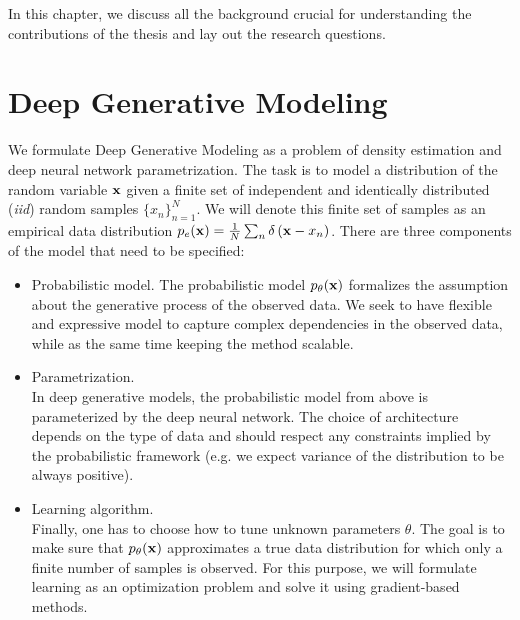 In this chapter, we discuss all the background crucial for understanding the contributions of the thesis and lay out the research questions. 


\section{Deep Generative Modeling}
We formulate Deep Generative Modeling as a problem of density estimation and deep neural network parametrization. 
The task is to model a distribution of the random variable ${\mathbf{x}}$ given a finite set of independent and identically distributed (\textit{iid}) random samples $\{x_n\}_{n=1}^N$. 
We will denote this finite set of samples as an empirical data distribution $p_e({\mathbf{x}}) = \frac1N \sum_n \delta\left({\mathbf{x}} - x_n\right)$. 
There are three components of the model that need to be specified:
\begin{itemize}
\item Probabilistic model. \newline 
{}
The probabilistic model $p_{\theta}({\mathbf{x}})$ formalizes the assumption about the generative process of the observed data. 
We seek to have flexible and expressive model to capture complex dependencies in the observed data, while as the same time keeping the method scalable.


\item Parametrization.\\
In deep generative models, the probabilistic model from above is parameterized by the deep neural network. 
The choice of architecture depends on the type of data and should respect any constraints implied by the probabilistic framework (e.g. we expect variance of the distribution to be always positive).

\item Learning algorithm. \\
Finally, one has to choose how to tune unknown parameters $\theta$. The goal is to make sure that $p_{\theta}({\mathbf{x}})$ approximates a true data distribution for which only a finite number of samples is observed. For this purpose, we will formulate learning as an optimization problem and solve it using gradient-based methods. 
\end{itemize}

